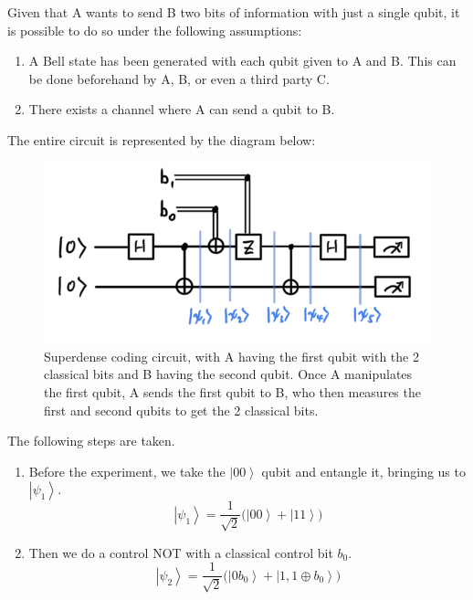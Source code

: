 \documentclass{article}
\newcommand{\ket}[1]{\ensuremath{\left|#1\right\rangle}}
\begin{document}
    \begin{theorem} 
      Given that A wants to send B two bits of information with just a single qubit, it is possible to do so under the following assumptions: 
      \begin{enumerate} 
        \item A Bell state has been generated with each qubit given to A and B. This can be done beforehand by A, B, or even a third party C.
        \item There exists a channel where A can send a qubit to B.
      \end{enumerate}
      The entire circuit is represented by the diagram below: 
      \begin{figure}[H]
        \centering 
        \includegraphics[scale=0.4]{img/superdense_coding.png}
        \caption{Superdense coding circuit, with A having the first qubit with the 2 classical bits and B having the second qubit. Once A manipulates the first qubit, A sends the first qubit to B, who then measures the first and second qubits to get the 2 classical bits. } 
        \label{fig:superdense_coding}
      \end{figure}
      The following steps are taken. 
      \begin{enumerate} 
        \item Before the experiment, we take the $\ket{00}$ qubit and entangle it, bringing us to $\ket{\psi_1}$. 
          \begin{equation} 
            \ket{\psi_1} = \frac{1}{\sqrt{2}} \big( \ket{00} + \ket{11} \big)
          \end{equation}
        \item Then we do a control NOT with a classical control bit $b_0$. 
          \begin{equation} 
            \ket{\psi_2} = \frac{1}{\sqrt{2}} \big( \ket{0 b_0} + \ket{1, 1 \oplus b_0} \big)
          \end{equation}

\end{enumerate}
\end{theorem}
\end{document}
